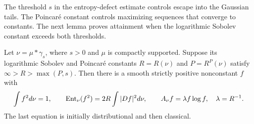 The threshold $s$ in the entropy-defect estimate controls escape into the
Gaussian tails.  The Poincar\'e constant controls maximizing sequences
that converge to constants.  The next lemma proves attainment when the
logarithmic Sobolev constant exceeds both thresholds.

\begin{lemma}\label{lem:optimizer}
Let $\nu=\mu*\gamma_s$, where $s>0$ and $\mu$ is compactly
supported. Suppose its logarithmic Sobolev and Poincar\'e constants
$R=R(\nu)$ and $P=R^P(\nu)$ satisfy
$\infty>R>\max(P,s)$. Then there is a smooth strictly positive
nonconstant $f$ with
\begin{equation}\label{eq:critical-optimizer}
 \int f^2d\nu=1,\qquad
 \operatorname{Ent}_\nu(f^2)=2R\int|Df|^2d\nu,\qquad
 A_\nu f=\lambda f\log f,\quad\lambda=R^{-1}.
\end{equation}
The last equation is initially distributional and then classical.
\end{lemma}

